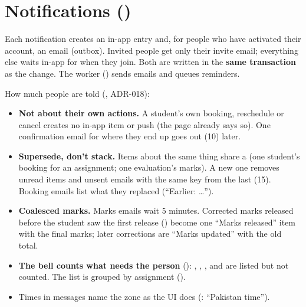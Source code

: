 \section[Notifications]{Notifications ()}

Each notification creates an in-app entry and, for people who have activated their account, an email (outbox). Invited people get only their invite email; everything else waits in-app for when they join. Both are written in the \textbf{same transaction} as the change. The worker () sends emails and queues reminders.

How much people are told (, ADR-018):
\begin{itemize}
  \item \textbf{Not about their own actions.} A student's own booking, reschedule or cancel creates no in-app item or push (the page already says so). One confirmation email for where they end up goes out  (10) later.
  \item \textbf{Supersede, don't stack.} Items about the same thing share a  (one student's booking for an assignment; one evaluation's marks). A new one removes unread items and unsent emails with the same key from the last  (15). Booking emails list what they replaced (``Earlier: …'').
  \item \textbf{Coalesced marks.} Marks emails wait 5 minutes. Corrected marks released before the student saw the first release () become one ``Marks released'' item with the final marks; later corrections are ``Marks updated'' with the old total.
  \item \textbf{The bell counts what needs the person} (): , , ,  and  are listed but not counted. The list is grouped by assignment ().
  \item Times in messages name the zone as the UI does (: ``Pakistan time'').
\end{itemize}

